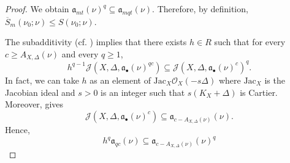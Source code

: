 \documentclass[a4paper,12pt]{amsart}
\theoremstyle{definition} %
\theoremstyle{remark}
\numberwithin{equation}{section}
\begin{document}
\begin{proof}
We obtain $\mathfrak{a}_{mt}(\nu)^q\subseteq \mathfrak{a}_{mqt}(\nu)$. Therefore, by definition, $\overline{S}_m(\nu_0;\nu)\le S(\nu_0;\nu)$.

\smallskip

The subadditivity (cf. \cite[Theorem]{Tak13}) implies that there exists $h\in R$ such that for every $c\ge A_{X,\Delta}(\nu)$ and every $q\ge 1$,
$$  h^{q-1}\mathcal{J}(X,\Delta,\mathfrak{a}_{\bullet}(\nu)^{qc})\subseteq \mathcal{J}(X,\Delta,\mathfrak{a}_{\bullet}(\nu)^c)^q.$$
In fact, we can take $h$ as an element of $\mathrm{Jac}_{X}\mathcal{O}_{X}(-s\Delta)$ where $\mathrm{Jac}_{X}$ is the Jacobian ideal and $s>0$ is an integer such that $s(K_X+\Delta)$ is Cartier. Moreover, \cite[Proposition 5.7]{BJ20} gives
$$ \mathcal{J}(X,\Delta,\mathfrak{a}_{\bullet}(\nu)^c)\subseteq \mathfrak{a}_{c-A_{X,\Delta}(\nu)}(\nu).$$
Hence,
\begin{equation} \label{mizmom}
h^q\mathfrak{a}_{qc}(\nu)\subseteq \mathfrak{a}_{c-A_{X,\Delta}(\nu)}(\nu)^q
\end{equation}

\smallskip


\end{proof}
\end{document}
